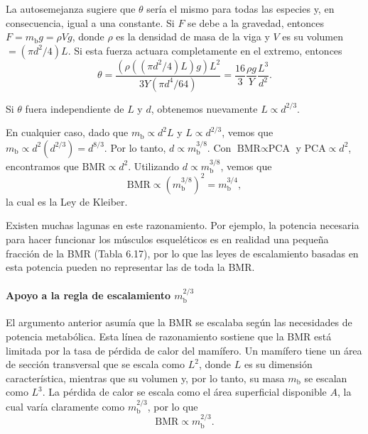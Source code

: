 \documentclass[12pt]{book}
\begin{document}
La autosemejanza sugiere que $\theta$ sería el mismo para todas las especies y, en consecuencia, igual a una constante. Si $F$ se debe a la gravedad, entonces $F = m_{\text{b}}g = \rho V g$, donde $\rho$ es la densidad de masa de la viga y $V$ es su volumen $= (\pi d^2/4)L$. Si esta fuerza actuara completamente en el extremo, entonces
\begin{equation}
\theta = \frac{(\rho((\pi d^2/4)L)g)L^2}{3Y(\pi d^4/64)} = \frac{16}{3} \frac{\rho g}{Y} \frac{L^3}{d^2}.
\label{eq:625}
\end{equation}

Si $\theta$ fuera independiente de $L$ y $d$, obtenemos nuevamente $L \propto d^{2/3}$.

En cualquier caso, dado que $m_{\text{b}} \propto d^2 L$ y $L \propto d^{2/3}$, vemos que $m_{\text{b}} \propto d^2(d^{2/3}) = d^{8/3}$. Por lo tanto, $d \propto m_{\text{b}}^{3/8}$. Con $\text{BMR} \propto \text{PCA}$ y $\text{PCA} \propto d^2$, encontramos que $\text{BMR} \propto d^2$. Utilizando $d \propto m_{\text{b}}^{3/8}$, vemos que
\begin{equation}
\text{BMR} \propto \left(m_{\text{b}}^{3/8}\right)^2 = m_{\text{b}}^{3/4},
\label{eq:626}
\end{equation}
la cual es la Ley de Kleiber.

Existen muchas lagunas en este razonamiento. Por ejemplo, la potencia necesaria para hacer funcionar los músculos esqueléticos es en realidad una pequeña fracción de la BMR (Tabla 6.17), por lo que las leyes de escalamiento basadas en esta potencia pueden no representar las de toda la BMR.

\paragraph*{Apoyo a la regla de escalamiento $m_{\text{b}}^{2/3}$}

El argumento anterior asumía que la BMR se escalaba según las necesidades de potencia metabólica. Esta línea de razonamiento sostiene que la BMR está limitada por la tasa de pérdida de calor del mamífero. Un mamífero tiene un área de sección transversal que se escala como $L^2$, donde $L$ es su dimensión característica, mientras que su volumen y, por lo tanto, su masa $m_{\text{b}}$ se escalan como $L^3$. La pérdida de calor se escala como el área superficial disponible $A$, la cual varía claramente como $m_{\text{b}}^{2/3}$, por lo que
\begin{equation}
\text{BMR} \propto m_{\text{b}}^{2/3}.
\label{eq:627}
\end{equation}
\end{document}
